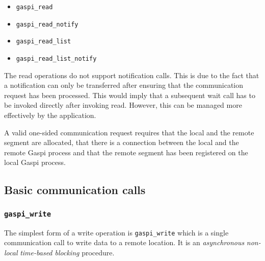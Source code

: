 \documentclass[a4paper]{article}
\newlength{\st}\setlength{\st}{0pt}
\newcommand{\zsep}[1]{#1}
\newcommand{\gaspiprefix}{gaspi}
\newcommand{\GASPI}{{\sc Gaspi}}
\newcommand{\function}[1]{{\tt #1}}
\newcommand{\gaspifunction}[1]{\function{\protect\zsep{\gaspiprefix\_#1}}}
\newcommand{\gaspisemantic}[1]{{\emph{#1}}}
\begin{document}
\begin{itemize}
\item \gaspifunction{read}
\item \gaspifunction{read\_notify}
\item \gaspifunction{read\_list}
\item \gaspifunction{read\_list\_notify}
\end{itemize}

The read operations do not support notification calls. This is due to
the fact that a notification can only be transferred after ensuring
that the communication request has been processed. This would imply
that a subsequent wait call has to be invoked directly after invoking
read. However, this can be managed more effectively by the
application.

A valid one-sided communication request requires that the local and
the remote segment are allocated, that there is a connection between
the local and the remote \GASPI{} process and that the remote segment
has been registered on the local \GASPI{} process.

\subsection{Basic communication calls}

\subsubsection{\gaspifunction{write}}

The simplest form of a write operation is \gaspifunction{write} which
is a single communication call to write data to a remote location.
It is an \gaspisemantic{asynchronous} \gaspisemantic{non-local}
\gaspisemantic{time-based blocking} procedure.
\end{document}

